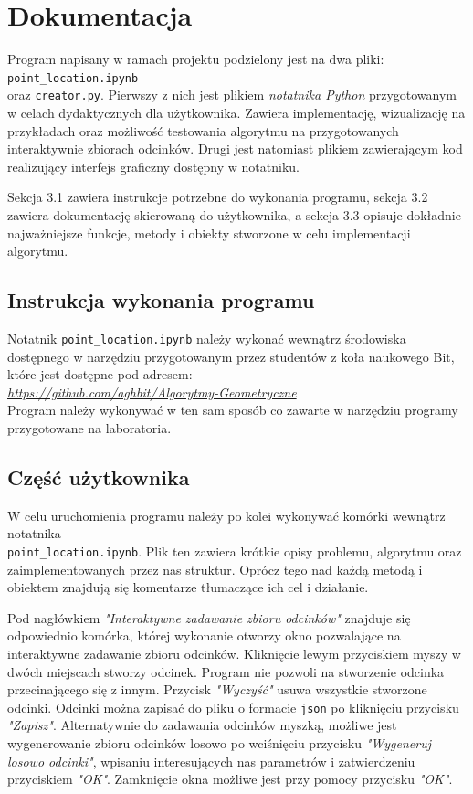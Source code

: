 \documentclass[11pt,a4paper]{article}
\begin{document}
\section{Dokumentacja}

Program napisany w ramach projektu podzielony jest
na dwa pliki: \verb|point_location.ipynb| \\
oraz \verb|creator.py|. Pierwszy z nich jest plikiem
\textit{notatnika Python} przygotowanym w celach dydaktycznych
dla użytkownika. Zawiera implementację, wizualizację na przykładach 
oraz możliwość testowania algorytmu na przygotowanych interaktywnie
zbiorach odcinków. Drugi jest natomiast plikiem
zawierającym kod realizujący interfejs graficzny dostępny w notatniku.

Sekcja 3.1 zawiera instrukcje potrzebne do wykonania programu,
sekcja 3.2 zawiera dokumentację skierowaną do użytkownika, %
a sekcja 3.3 opisuje dokładnie najważniejsze funkcje, metody
i obiekty stworzone w celu implementacji algorytmu.

\subsection{Instrukcja wykonania programu}
Notatnik \verb|point_location.ipynb| należy wykonać
wewnątrz środowiska dostępnego w narzędziu 
przygotowanym przez studentów z koła naukowego Bit, 
które jest dostępne pod adresem:
\\
\emph{\hyperlink{https://github.com/aghbit/Algorytmy-Geometryczne}
{https://github.com/aghbit/Algorytmy-Geometryczne}}
\\
Program należy wykonywać w ten sam sposób co
zawarte w narzędziu programy przygotowane na laboratoria.

\subsection{Część użytkownika}
W celu uruchomienia programu należy po kolei
wykonywać komórki wewnątrz notatnika \\
\verb|point_location.ipynb|. Plik ten zawiera
krótkie opisy problemu, algorytmu oraz zaimplementowanych
przez nas struktur. Oprócz tego nad każdą metodą i obiektem
znajdują się komentarze tłumaczące ich cel i działanie.

Pod nagłówkiem \emph{"Interaktywne zadawanie zbioru odcinków"}
znajduje się odpowiednio komórka, której wykonanie otworzy
okno pozwalające na interaktywne zadawanie zbioru odcinków.
Kliknięcie lewym przyciskiem myszy w dwóch miejscach stworzy odcinek. 
Program nie pozwoli na stworzenie odcinka przecinającego się z innym.
Przycisk \emph{"Wyczyść"} usuwa wszystkie stworzone odcinki.
Odcinki można zapisać do pliku o formacie \verb|json| po kliknięciu
przycisku \emph{"Zapisz"}. Alternatywnie do zadawania odcinków myszką,
możliwe jest wygenerowanie zbioru odcinków losowo po wciśnięciu
przycisku \emph{"Wygeneruj losowo odcinki"}, wpisaniu interesujących
nas parametrów i zatwierdzeniu przyciskiem \emph{"OK"}. Zamknięcie
okna możliwe jest przy pomocy przycisku \emph{"OK"}.
\end{document}
